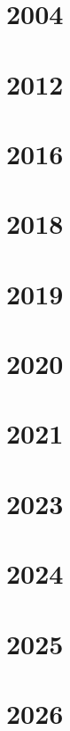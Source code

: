 \section{2004}

\section{2012}

\section{2016}

\section{2018}

\section{2019}


\section{2020}




\section{2021}



\section{2023}

\section{2024}


\section{2025}


\section{2026}


